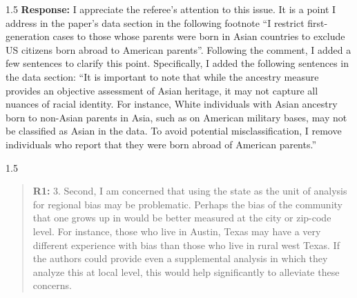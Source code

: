 \documentclass[12pt,english]{article}
\newcommand{\rrxspc}{1.5}
\begin{document}
\begin{refsection}
    \begin{spacing}{\rrxspc}
        \textbf{Response:} I appreciate the referee's attention to this issue. It is a point I address in the paper's data section in the following footnote ``I restrict first-generation cases to those whose parents were born in Asian countries to exclude US citizens born abroad to American parents''. Following the comment, I added a few sentences to clarify this point. Specifically, I added the following sentences in the data section: ``It is important to note that while the ancestry measure provides an objective assessment of Asian heritage, it may not capture all nuances of racial identity. For instance, White individuals with Asian ancestry born to non-Asian parents in Asia, such as on American military bases, may not be classified as Asian in the data. To avoid potential misclassification, I remove individuals who report that they were born abroad of American parents.''
    \end{spacing}    

    \begin{spacing}{\rrxspc}
        \begin{quotation}
            \textbf{R1: } 3. Second, I am concerned that using the state as the unit of analysis for regional bias may be problematic. Perhaps the bias of the community that one grows up in would be better measured at the city or zip-code level. For instance, those who live in Austin, Texas may have a very different experience with bias than those who live in rural west Texas. If the authors could provide even a supplemental analysis in which they analyze this at local level, this would help significantly to alleviate these concerns.
    \end{quotation}
        \end{spacing}
            

\end{refsection}
\end{document}
